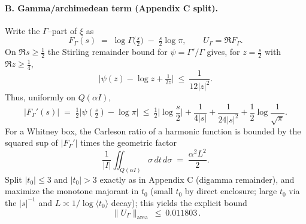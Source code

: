 \documentclass[11pt]{article}
\theoremstyle{definition}
\theoremstyle{remark}
\begin{document}
\paragraph{B. Gamma/archimedean term (Appendix C split).}
Write the $\Gamma$–part of $\xi$ as
\[
F_\Gamma(s)\;=\;\log\Gamma\!\big(\tfrac{s}{2}\big)\;-
\;\tfrac{s}{2}\log\pi,\qquad U_\Gamma=\Re F_\Gamma.
\]
On $\Re s\ge\tfrac12$ the Stirling remainder bound for $\psi=\Gamma'/\Gamma$ gives, for $z=\tfrac{s}{2}$ with $\Re z\ge\tfrac14$,
\[
\big|\psi(z)-\log z+\tfrac{1}{2z}\big|\ \le\ \frac{1}{12|z|^2}.
\]
Thus, uniformly on $Q(\alpha I)$,
\[
|F_\Gamma'(s)|\;=\;\tfrac12\big|\psi(\tfrac{s}{2})-\log\pi\big|\ \le\ \tfrac12\Big|\log\frac{s}{2}\Big|+\frac{1}{4|s|}+\frac{1}{24|s|^2}+\frac12\log\frac{1}{\sqrt\pi}.
\]
For a Whitney box, the Carleson ratio of a harmonic function is bounded by the squared sup of $|F_\Gamma'|$ times the geometric factor
\[
\frac{1}{|I|}\iint_{Q(\alpha I)}\sigma\,dt\,d\sigma\;=\;\frac{\alpha^2 L^2}{2}.
\]
Split $|t_0|\le 3$ and $|t_0|>3$ exactly as in Appendix C (digamma remainder), and maximize the monotone majorant in $t_0$ (small $t_0$ by direct enclosure; large $t_0$ via the $|s|^{-1}$ and $L\asymp1/\log\langle t_0\rangle$ decay); this yields the explicit bound
\[
\boxed{\,\|U_\Gamma\|_{\mathrm{area}}\ \le\ 0.011803\,}.
\]
\end{document}
